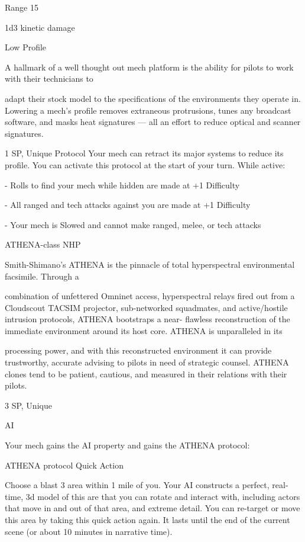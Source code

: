 Range 15
 
1d3 kinetic damage
 

Low Profile  

A hallmark of a well thought out mech platform is the ability for pilots to work with their technicians to  

adapt their stock model to the specifications of the environments they operate in. Lowering a mech’s profile  
removes extraneous protrusions, tunes any broadcast software, and masks heat signatures — all an effort  
to reduce optical and scanner signatures.   

1 SP, Unique  
Protocol  
Your mech can retract its major systems to reduce its profile. You can activate this protocol at  
the start of your turn. While active:
 
     -   Rolls to find your mech while hidden are made at +1 Difficulty
 
     -   All ranged and tech attacks against you are made at +1 Difficulty
 
     -   Your mech is Slowed and cannot make ranged, melee, or tech attacks
 

ATHENA-class NHP  

Smith-Shimano’s ATHENA is the pinnacle of total hyperspectral environmental facsimile. Through a  

combination of unfettered Omninet access, hyperspectral relays fired out from a Cloudscout TACSIM  
projector, sub-networked squadmates, and active/hostile intrusion protocols, ATHENA bootstraps a near- 
flawless reconstruction of the immediate environment around its host core. ATHENA is unparalleled in its  

processing power, and with this reconstructed environment it can provide trustworthy, accurate advising to  
pilots in need of strategic counsel.   
ATHENA clones tend to be patient, cautious, and measured in their relations with their pilots.  

                                                                                                               


   
3 SP, Unique
 
AI  

Your mech gains the AI property and gains the ATHENA protocol:
 

         ATHENA protocol  
          Quick Action
 
          Choose a blast 3 area within 1 mile of you. Your AI constructs a perfect, real-time, 3d  
          model of this are that you can rotate and interact with, including actors that move in and  
          out of that area, and extreme detail. You can re-target or move this area by taking this  
          quick action again. It lasts until the end of the current scene (or about 10 minutes in  
          narrative time).
 

